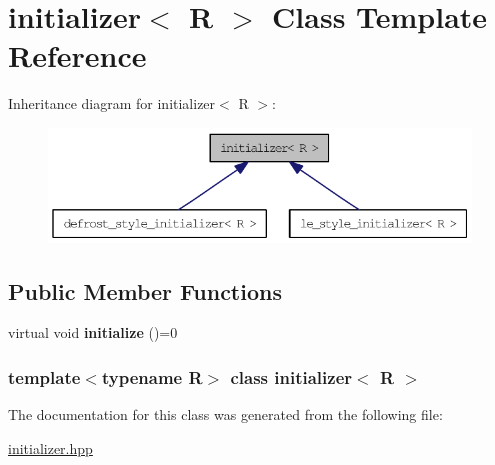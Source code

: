 \hypertarget{classinitializer}{
\section{initializer$<$ R $>$ Class Template Reference}
\label{classinitializer}
}
Inheritance diagram for initializer$<$ R $>$:\nopagebreak
\begin{figure}[H]
\begin{center}
\leavevmode
\includegraphics[width=362pt]{classinitializer__inherit__graph}
\end{center}
\end{figure}
\subsection*{Public Member Functions}
\begin{DoxyCompactItemize}
\item 
\hypertarget{classinitializer_a2d4f4facf21abb93ad032dd51c77e082}{
virtual void {\bfseries initialize} ()=0}
\label{classinitializer_a2d4f4facf21abb93ad032dd51c77e082}

\end{DoxyCompactItemize}
\subsubsection*{template$<$typename R$>$ class initializer$<$ R $>$}



The documentation for this class was generated from the following file:\begin{DoxyCompactItemize}
\item 
\hyperlink{initializer_8hpp}{initializer.hpp}\end{DoxyCompactItemize}
